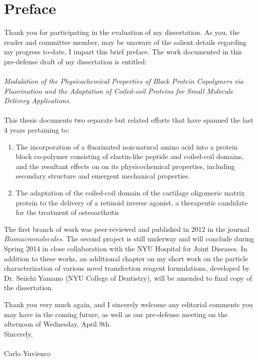 \section*{Preface}

Thank you for participating in the evaluation of my dissertation. As you, the
reader and committee member, may be unaware of the salient details regarding my
progress to-date, I impart this brief preface.  The work
documented in this pre-defense draft of my dissertation is entitled:
\hspace{0pt}\\
\hspace{0pt}\\
\emph{Modulation of the Physicochemical Properties of Block Protein Copolymers
via Fluorination and the Adaptation of Coiled-coil Proteins for Small Molecule
Delivery Applications}.
\hspace{0pt}\\
\hspace{0pt}\\
This thesis documents two separate but related efforts that have spanned the
last 4 years pertaining to:
   
\begin{enumerate}

    \item The incorporation of a fluorinated non-natural amino acid into a
        protein block co-polymer consisting of elastin-like peptide and
        coiled-coil domains, and the resultant effects on on its physicochemical
        properties, including secondary structure and emergent mechanical
        properties.

    \item The adaptation of the coiled-coil domain of the cartilage oligomeric
        matrix protein to the delivery of a retinoid inverse agonist, a
        therapeutic candidate for the treatment of osteoarthritis

\end{enumerate}
The first branch of work was peer-reviewed and published in 2012 in the
journal \emph{Biomacromolecules}. The second project is still underway and will
conclude during Spring 2014 in close collaboration with the NYU Hospital for
Joint Diseases. In addition to these works, an additional chapter on my short
work on the particle characterization of various novel transfection
reagent formulations, developed by Dr. Seiichi Yamano (NYU College of
Dentistry), will be amended to final copy of the dissertation.

Thank you very much again, and I sincerely welcome any editorial comments you
may have in the coming future, as well as our pre-defense meeting on the
afternoon of Wednesday, April 9th.
\hspace{0pt}\\
Sincerely,
\hspace{0pt}\\
\hspace{0pt}\\
Carlo Yuvienco
